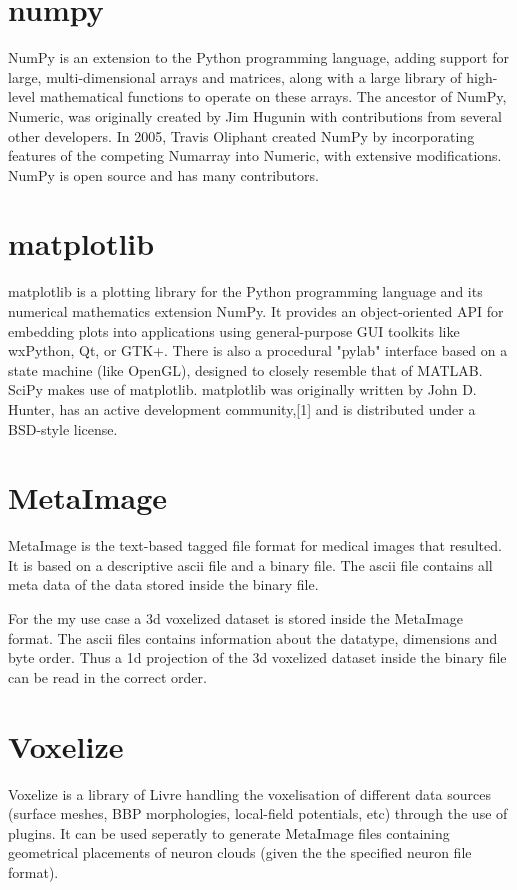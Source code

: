 \section{numpy}
\label{sec:numpy}
NumPy is an extension to the Python programming language, adding support for large, multi-dimensional arrays and matrices, along with a large library of high-level mathematical functions to operate on these arrays. The ancestor of NumPy, Numeric, was originally created by Jim Hugunin with contributions from several other developers. In 2005, Travis Oliphant created NumPy by incorporating features of the competing Numarray into Numeric, with extensive modifications. NumPy is open source and has many contributors. \cite{numpy}
\section{matplotlib}
\label{sec:matplotlib}
matplotlib is a plotting library for the Python programming language and its numerical mathematics extension NumPy. It provides an object-oriented API for embedding plots into applications using general-purpose GUI toolkits like wxPython, Qt, or GTK+. There is also a procedural "pylab" interface based on a state machine (like OpenGL), designed to closely resemble that of MATLAB. SciPy makes use of matplotlib.
matplotlib was originally written by John D. Hunter, has an active development community,[1] and is distributed under a BSD-style license. \cite{matplotlib}
\section{MetaImage}
\label{sec:MetaImage}
MetaImage is the text-based tagged file format for medical images that resulted. \cite{metaimage}
It is based on a descriptive ascii file and a binary file.
The ascii file contains all meta data of the data stored inside the binary file.

For the my use case a 3d voxelized dataset is stored inside the MetaImage format.
The ascii files contains information about the datatype, dimensions and byte order.
Thus a 1d projection of the 3d voxelized dataset inside the binary file can be read in the correct order.

\section{Voxelize}
\label{sec:voxelize}
Voxelize is a library of Livre handling the voxelisation of different data sources (surface meshes, BBP morphologies, local-field potentials, etc) through the use of plugins.\cite{livre}
It can be used seperatly to generate MetaImage files containing geometrical placements of neuron clouds (given the the specified neuron file format).
